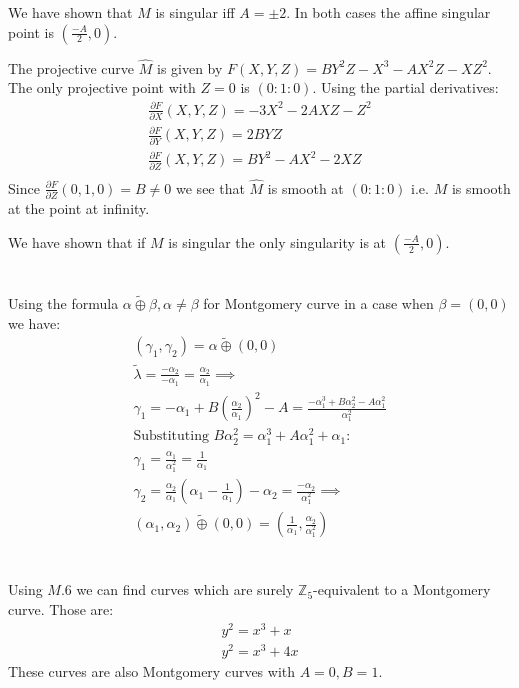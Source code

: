 \documentclass[12pt, a4paper]{article}
\begin{document}
We have shown that $M$ is singular iff $A = \pm 2$. In both cases the affine singular point is $(\frac{-A}{2}, 0)$.

The projective curve $\hat{M}$ is given by $F(X,Y,Z) = BY^2Z-X^3-AX^2Z-XZ^2$. The only projective point with $Z=0$ is $(0:1:0)$. Using the partial derivatives:
\begin{gather*}
\frac{\partial F}{\partial X}(X,Y,Z) = -3X^2-2AXZ-Z^2\\
\frac{\partial F}{\partial Y}(X,Y,Z) = 2BYZ\\
\frac{\partial F}{\partial Z}(X,Y,Z) = BY^2-AX^2-2XZ\\
\end{gather*}
Since $\frac{\partial F}{\partial Z}(0,1,0) = B \neq 0$ we see that $\hat{M}$ is smooth at $(0:1:0)$ i.e. $M$ is smooth at the point at infinity.

We have shown that if $M$ is singular the only singularity is at $(\frac{-A}{2}, 0)$.

\section{}
Using the formula $\alpha \tilde{\oplus} \beta, \alpha \neq \beta$ for Montgomery curve in a case when $\beta = (0,0)$ we have:
\begin{gather*}
(\gamma_1, \gamma_2) = \alpha \tilde{\oplus} (0,0)\\
\tilde{\lambda} = \frac{-\alpha_2}{-\alpha_1} = \frac{\alpha_2}{\alpha_1} \implies\\
\gamma_1 = -\alpha_1 +B\left(\frac{\alpha_2}{\alpha_1}\right)^2-A = \frac{-\alpha_1^3+B\alpha_2^2-A\alpha_1^2}{\alpha_1^2}\\
\text{Substituting $B\alpha_2^2 = \alpha_1^3+A\alpha_1^2+\alpha_1$:}\\
\gamma_1 = \frac{\alpha_1}{\alpha_1^2} = \frac{1}{\alpha_1}\\
\gamma_2 = \frac{\alpha_2}{\alpha_1}\left(\alpha_1 - \frac{1}{\alpha_1}\right)-\alpha_2 = \frac{-\alpha_2}{\alpha_1^2} \implies\\
(\alpha_1, \alpha_2) \tilde{\oplus} (0,0) = \left(\frac{1}{\alpha_1}, \frac{\alpha_2}{\alpha_1^2}\right)
\end{gather*}

\section{}
Using $M.6$ we can find curves which are surely $\mathbb{Z}_5$-equivalent to a Montgomery curve. Those are:
\begin{gather*}
y^2=x^3+x\\
y^2=x^3+4x
\end{gather*}
These curves are also Montgomery curves with $A=0, B = 1$. 
\end{document}

